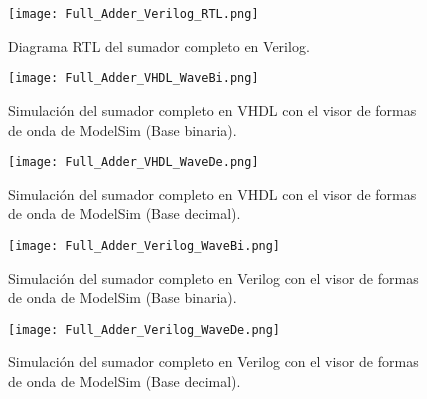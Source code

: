 \begin{figure}[ht]
	\centering
	\texttt{[image: Full\_Adder\_Verilog\_RTL.png]}
	\caption{Diagrama RTL del sumador completo en Verilog. \label{fig:full_adder_verilog_rtl}}
\end{figure}

\begin{figure}[ht]
	\centering
	\texttt{[image: Full\_Adder\_VHDL\_WaveBi.png]}
	\caption{Simulación del sumador completo en VHDL con el visor de formas de onda de ModelSim (Base binaria). \label{fig:full_adder_vhdl_WaveBi}}
\end{figure}

\begin{figure}[ht]
	\centering
	\texttt{[image: Full\_Adder\_VHDL\_WaveDe.png]}
	\caption{Simulación del sumador completo en VHDL con el visor de formas de onda de ModelSim (Base decimal). \label{fig:full_adder_vhdl_WaveDe}}
\end{figure}

\begin{figure}[ht]
	\centering
	\texttt{[image: Full\_Adder\_Verilog\_WaveBi.png]}
	\caption{Simulación del sumador completo en Verilog con el visor de formas de onda de ModelSim (Base binaria). \label{fig:full_adder_verilog_WaveBi}}
\end{figure}

\begin{figure}[ht]
	\centering
	\texttt{[image: Full\_Adder\_Verilog\_WaveDe.png]}
	\caption{Simulación del sumador completo en Verilog con el visor de formas de onda de ModelSim (Base decimal). \label{fig:full_adder_verilog_WaveDe}}
\end{figure}





